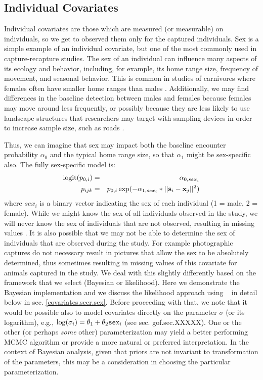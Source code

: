 \subsection{Individual Covariates}
\label{covariates.sec.sex}


Individual covariates are those which are measured (or measurable) on
individuals, so we get to observed them only for the captured
individuals. Sex is a simple example of an individual covariate, but
one of the most commonly used in capture-recapture studies. 
The sex of an individual can influence many aspects of its ecology and
behavior, including, for example, its home range size, frequency of
movement, and seasonal behavior. This is common in studies of
carnivores where females often have smaller home ranges than males
\citep{gardner_etal:2010jwm, sollmann_etal:2011}. Additionally, we may
find differences in the baseline detection between males and females
because females may move around less frequently, or possibly because
they are less likely to use landscape structures that researchers may
target with sampling devices in order to increase sample size, such as
roads \citep[e.g.][]{salom-perez_etal:2007}.

Thus, we can imagine that sex may impact both the baseline encounter
probability $\alpha_{0}$ and the typical home range
size, so that
$\alpha_{1}$ might be sex-specific also.  The fully sex-specific model is:
\begin{eqnarray*}
\mbox{logit}(p_{0,i}) &= &\alpha_{0,sex_{i}}  \\
p_{ijk} &= &p_{0,i} \exp(- \alpha_{1, sex_{i}}*||{\bf s}_{i}-{\bf x}_{j}||^2)
\end{eqnarray*}
where $sex_{i}$ is a binary vector indicating the sex of
each individual (1 = male, 2 = female).  While we might know the sex of all
individuals observed in the study, we will never know the
sex of individuals that are not observed,
resulting in missing values \citep{gardner_etal:2010jwm}.
It is also possible that we may not be able to determine the sex of
individuals that are observed during the study. For example photographic
captures do not necessary result in pictures that allow the sex to be absolutely
determined, thus sometimes resulting in missing values of this covariate for animals
captured in the study.   We deal with this slightly differently based on the framework
that we select (Bayesian or likelihood).  Here we demonstrate the Bayesian implementation 
and we discuss the likelihood approach using \secr~ in detail
below in sec. \ref{covariates.secr.sex}.
Before proceeding with that, we note that it would be possible also to
model covariates directly on the parameter $\sigma$ (or its
logarithm), e.g., $\log(\sigma_{i}) = \theta_{1} + \theta_{2}
\mbox{\tt sex}_{i}$ (see sec. gof.sec.XXXXX). One or the other (or perhaps {\it some} other)
parameterization may yield a better performing MCMC algorithm or provide a
more natural or preferred interpretation.
In the context of Bayesian analysis, given that priors are not
invariant to transformation of the parameters, this may be a
consideration in choosing the particular parameterization.



